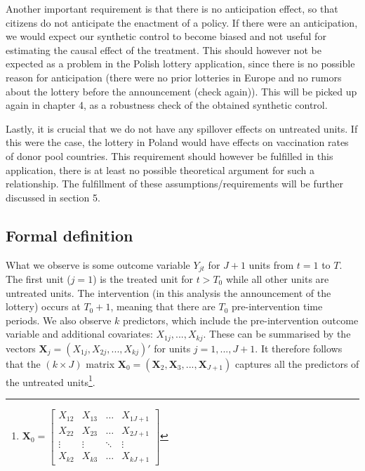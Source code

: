 \documentclass{scrbook}
\begin{document}
Another important requirement is that there is no anticipation effect,
so that citizens do not anticipate the enactment of a policy. If there
were an anticipation, we would expect our synthetic control to become
biased and not useful for estimating the causal effect of the treatment.
This should however not be expected as a problem in the Polish lottery
application, since there is no possible reason for anticipation (there
were no prior lotteries in Europe and no rumors about the lottery before
the announcement (check again)). This will be picked up again in chapter
4, as a robustness check of the obtained synthetic control.

Lastly, it is crucial that we do not have any spillover effects on
untreated units. If this were the case, the lottery in Poland would have
effects on vaccination rates of donor pool countries. This requirement
should however be fulfilled in this application, there is at least no
possible theoretical argument for such a relationship. The fulfillment
of these assumptions/requirements will be further discussed in section
5.

\subsection*{Formal definition}

What we observe is some outcome variable \(Y_{jt}\) for \(J + 1\) units
from \(t=1\) to \(T\). The first unit (\(j = 1\)) is the treated unit
for \(t>T_{0}\) while all other units are untreated units. The
intervention (in this analysis the announcement of the lottery) occurs
at \(T_{0}+1\), meaning that there are \(T_{0}\) pre-intervention time
periods. We also observe \(k\) predictors, which include the
pre-intervention outcome variable and additional covariates:
\(X_{1j},...,X_{kj}\). These can be summarised by the vectors
\(\mathbf{X}_{j}=(X_{1j},X_{2j},...,X_{kj})'\) for units
\(j=1,...,J + 1\). It therefore follows that the \((k\times J)\) matrix
\(\mathbf{X}_{0}=(\mathbf{X}_{2},\mathbf{X}_{3},...,\mathbf{X}_{J + 1})\)
captures all the predictors of the untreated
units\footnote{\(\mathbf{X}_0=
\begin{bmatrix}
X_{12} & X_{13} & \dots & X_{1J+1}\\
X_{22} & X_{23} & \dots & X_{2J+1}\\
\vdots & \vdots & \ddots & \vdots\\
X_{k2} & X_{k3} & \dots & X_{kJ + 1}
\end{bmatrix}\)}.
\end{document}
